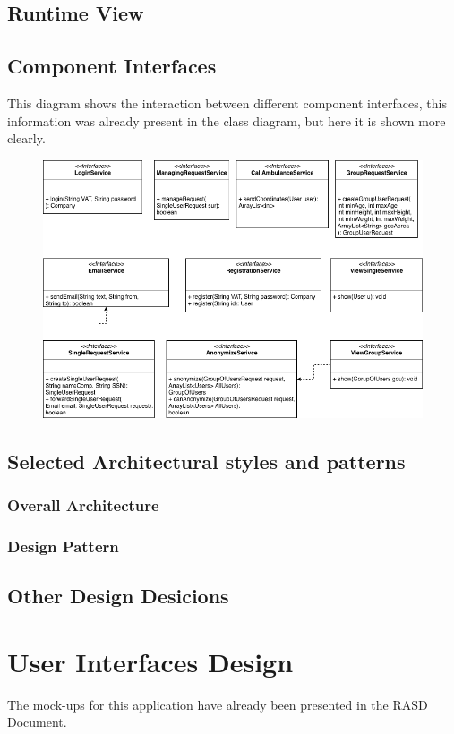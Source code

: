 \documentclass{article}
\begin{document}
\subsection{Runtime View}
\newpage
\subsection{Component Interfaces}
This diagram shows the interaction between different component interfaces, this information was already present in the class diagram, but here it is shown more clearly.
\begin{figure}[h!]
\centering
    \textbf{}\par\medskip
	\includegraphics[width= \linewidth]{inter.png}
\end{figure}
\newpage
\subsection{Selected Architectural styles and patterns}
\subsubsection{Overall Architecture}

\subsubsection{Design Pattern}

\subsection{Other Design Desicions}
\newpage
\section{User Interfaces Design}
The mock-ups for this application have already been presented in the RASD Document.
\end{document}

